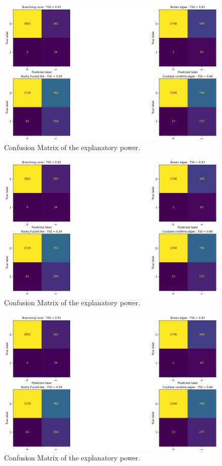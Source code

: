 \begin{figure}
\hypertarget{fig:chap3figS6}{%
\centering
\includegraphics{03-Chapitre3/figures/supplementary/03-confusion_matrix_train_all_a.png}
\caption{Confusion Matrix of the explanatory
power.}\label{fig:chap3figS6}
}
\end{figure}
\begin{figure}
\ContinuedFloat
\centering
\includegraphics{03-Chapitre3/figures/supplementary/03-confusion_matrix_train_all_b.png}
\caption{Confusion Matrix of the explanatory
power.}
\end{figure}
\begin{figure}
\ContinuedFloat
\centering
\includegraphics{03-Chapitre3/figures/supplementary/03-confusion_matrix_train_all_c.png}
\caption{Confusion Matrix of the explanatory
power.}
\end{figure}

